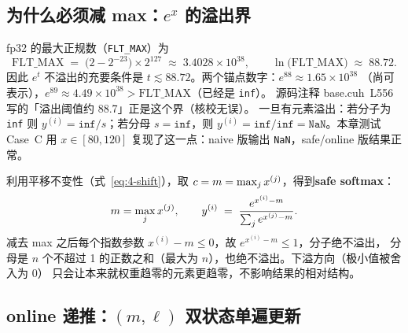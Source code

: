 \subsection{为什么必须减 max：$e^{x}$ 的溢出界}

fp32 的最大正规数（\texttt{FLT\_MAX}）为
\begin{equation}
  \mathrm{FLT\_MAX} \;=\; \bigl(2 - 2^{-23}\bigr) \times 2^{127}
  \;\approx\; 3.4028 \times 10^{38},
  \qquad
  \ln\bigl(\mathrm{FLT\_MAX}\bigr) \;\approx\; 88.72 .
  \label{eq:4-fltmax}
\end{equation}
因此 $e^{t}$ 不溢出的充要条件是 $t \lesssim 88.72$。两个锚点数字：$e^{88} \approx 1.65\times 10^{38}$
（尚可表示），$e^{89} \approx 4.49\times 10^{38} > \mathrm{FLT\_MAX}$（已经是 \texttt{inf}）。
源码注释 base.cuh~L556 写的「溢出阈值约 88.7」正是这个界（核校无误）。
一旦有元素溢出：若分子为 \texttt{inf} 则 $y^{(i)} = \texttt{inf}/s$；若分母
$s = \texttt{inf}$，则 $y^{(i)} = \texttt{inf}/\texttt{inf} = \texttt{NaN}$。本章测试
Case~C 用 $x \in [80, 120]$ 复现了这一点：naive 版输出 \texttt{NaN}，safe/online 版结果正常。

利用平移不变性（式~\ref{eq:4-shift}），取 $c = m = \max\sb{j} x^{(j)}$，得到\textbf{safe softmax}：
\begin{equation}
  m = \max\sb{j} x^{(j)},
  \qquad
  y^{(i)} \;=\; \frac{e^{x^{(i)} - m}}{\sum\sb{j} e^{x^{(j)} - m}} .
  \label{eq:4-safe}
\end{equation}
减去 max 之后每个指数参数 $x^{(i)} - m \le 0$，故 $e^{x^{(i)} - m} \le 1$，分子绝不溢出，
分母是 $n$ 个不超过 1 的正数之和（最大为 $n$），也绝不溢出。下溢方向（极小值被舍入为 0）
只会让本来就权重趋零的元素更趋零，不影响结果的相对结构。

\subsection{online 递推：$(m, \ell)$ 双状态单遍更新}

